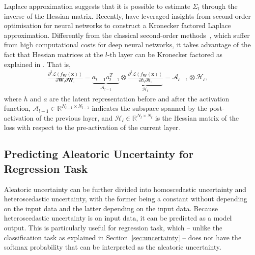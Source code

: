 Laplace approximation suggests that it is possible to estimate $\Sigma_{l}$ through the inverse of the Hessian matrix.
Recently, \cite{botev2017practical,ritter2018scalable} have leveraged insights from second-order optimisation for neural networks to construct a Kronecker factored Laplace approximation.
Differently from the classical second-order methods~\cite{battiti1992first,shepherd2012second}, which suffer from high computational costs for deep neural networks, it takes advantage of the fact that Hessian matrices at the $l$-th layer can be Kronecker factored as explained in \cite{martens2015optimizing,botev2017practical}.                           
That is,
\begin{equation} \label{eq:hessian-decompose}
\begin{aligned}
    \frac{\partial^2 \mathcal{L}(f_{\mathbf{W}}(\mathbf{x}))}{\partial \mathbf{W}_l \partial \mathbf{W}_l}=\underbrace{a_{l-1}a_{l-1}^T}_{\mathcal{A}_{l-1}} \otimes \underbrace{\frac{\partial^2 \mathcal{L}(f_{\mathbf{W}}(\mathbf{x}))}{\partial h_{l}\partial h_{l}}}_{\mathcal{H}_{l}}=\mathcal{A}_{l-1} \otimes \mathcal{H}_{l},
\end{aligned}
\end{equation}
where $h$ and $a$ are the latent representation before and after the activation function, $\mathcal{A}_{l-1} \in \mathbb{R}^{N_{l-1} \times N_{l-1}}$ indicates the subspace spanned by the post-activation of the previous layer, and $\mathcal{H}_{l} \in \mathbb{R}^{N_{l} \times N_{l}}$ is the Hessian matrix of the loss with respect to the pre-activation of the current layer.










\subsection{Predicting Aleatoric Uncertainty for Regression Task}\label{sec:predictingAleatoric}

Aleatoric uncertainty can be further divided into homoscedastic uncertainty and heteroscedastic uncertainty, with the former being a constant without depending on the input data and the latter depending on the input data. Because heteroscedastic uncertainty is on input data, it can be predicted as a model output. This is particularly useful for regression task, which -- unlike the classification task as explained in Section~\ref{sec:uncertainty} -- does not have the softmax probability that can be interpreted as the aleatoric uncertainty. 

